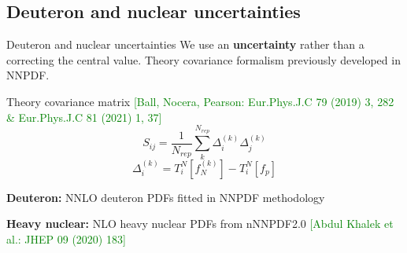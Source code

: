 \author[Rosalyn Pearson]{}
\subsection{Deuteron and nuclear uncertainties}


\begin{frame}[fragile]{Deuteron and nuclear uncertainties}
We use an {\bf uncertainty} rather than a correcting the central value.
\newline
Theory covariance formalism previously developed in NNPDF.
      \begin{block}{Theory covariance matrix \tiny{ \textcolor{green}{[Ball, Nocera, Pearson: Eur.Phys.J.C 79 (2019) 3, 282 \& Eur.Phys.J.C 81 (2021) 1, 37]}}}
        \begin{equation}
            S_{ij} = \frac{1}{N_{rep}} \sum_k^{N_{rep}} \Delta_i^{(k)}\Delta_j^{(k)}
        \end{equation}
        \begin{equation}
            \Delta_i^{(k)} = T_i^{N}[f_{N}^{(k)}] - T_i^{N}[f_{p}]
        \end{equation}
      \end{block}
      
    \textbf{Deuteron:} NNLO deuteron PDFs fitted in NNPDF methodology 
    
    \textbf{Heavy nuclear:} NLO heavy nuclear PDFs from nNNPDF2.0 \tiny{ \textcolor{green}{[Abdul Khalek et al.: JHEP 09 (2020) 183]}}
  \begin{table}
    \caption{$\chi^2$ per deuteron/nuclear dataset}
  \end{table}
\end{frame}

